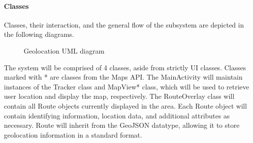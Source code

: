 ﻿\documentclass{article}
\begin{document}
\paragraph{Classes}
Classes, their interaction, and the general flow of the subsystem are depicted in the following diagrams.

\begin{figure}[H]
    \centering
    \begin{center}
    \end{center}
    \caption{Geolocation UML diagram}
    \label{fig:my_label}
\end{figure}

The system will be comprised of 4 classes, aside from strictly UI classes. Classes marked with * are classes from the Maps API. The MainActivity will maintain instances of the Tracker class and MapView* class, which will be used to retrieve user location and display the map, respectively. The RouteOverlay class will contain all Route objects currently displayed in the area. Each Route object will contain identifying information, location data, and additional attributes as necessary. Route will inherit from the GeoJSON datatype, allowing it to store geolocation information in a standard format.
\end{document}
